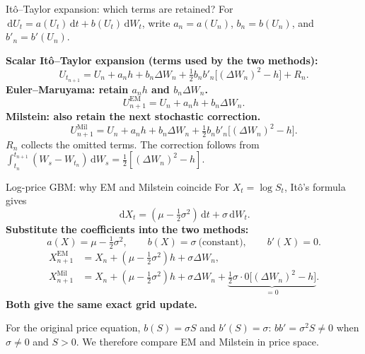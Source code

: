 \documentclass[aspectratio=169,11pt]{beamer}
\newcommand{\dd}{\,\mathrm d}
\begin{document}
\begin{frame}{It\^o--Taylor expansion: which terms are retained?}
\small
For $\dd U_t=a(U_t)\dd t+b(U_t)\dd W_t$, write
$a_n=a(U_n)$, $b_n=b(U_n)$, and $b'_n=b'(U_n)$.
\medskip

\textbf{Scalar It\^o--Taylor expansion (terms used by the two methods):}
\[
 U_{t_{n+1}}=U_n+a_nh+b_n\Delta W_n
 +\tfrac12b_nb'_n\bigl[(\Delta W_n)^2-h\bigr]+R_n.
\]
\textbf{Euler--Maruyama: retain $a_nh$ and $b_n\Delta W_n$.}
\[
 \boxed{U_{n+1}^{\mathrm{EM}}=U_n+a_nh+b_n\Delta W_n.}
\]
\textbf{Milstein: also retain the next stochastic correction.}
\[
 \boxed{U_{n+1}^{\mathrm{Mil}}=U_n+a_nh+b_n\Delta W_n
 +\tfrac12b_nb'_n\bigl[(\Delta W_n)^2-h\bigr].}
\]
$R_n$ collects the omitted terms. The correction follows from
$\int_{t_n}^{t_{n+1}}(W_s-W_{t_n})\dd W_s
 =\tfrac12[(\Delta W_n)^2-h]$.
\end{frame}

\begin{frame}{Log-price GBM: why EM and Milstein coincide}
\small
For $X_t=\log S_t$, It\^o's formula gives
\[
 \dd X_t=(\mu-\tfrac12\sigma^2)\dd t+\sigma\dd W_t.
\]
\textbf{Substitute the coefficients into the two methods:}
\[
 a(X)=\mu-\tfrac12\sigma^2,\qquad
 b(X)=\sigma\ \text{(constant)},\qquad \boxed{b'(X)=0.}
\]
\begin{align*}
 X_{n+1}^{\mathrm{EM}}&=X_n+(\mu-\tfrac12\sigma^2)h+\sigma\Delta W_n,\\
 X_{n+1}^{\mathrm{Mil}}&=X_n+(\mu-\tfrac12\sigma^2)h+\sigma\Delta W_n
 +\underbrace{\tfrac12\sigma\cdot0\bigl[(\Delta W_n)^2-h\bigr]}_{=0}.
\end{align*}
\textbf{Both give the same exact grid update.}
\medskip

For the original price equation, $b(S)=\sigma S$ and $b'(S)=\sigma$:
$bb'=\sigma^2S\ne0$ when $\sigma\ne0$ and $S>0$.
We therefore compare EM and Milstein in price space.
\end{frame}
\end{document}
